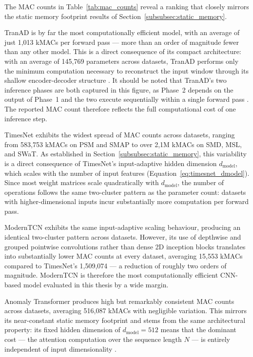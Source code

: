 \documentclass[twoside,11pt,openright]{report}
\begin{document}
The MAC counts in Table~\ref{tab:mac_counts} reveal a ranking that closely mirrors
the static memory footprint results of Section~\ref{subsubsec:static_memory}.

TranAD \citep{tranad2022} is by far the most computationally efficient model,
with an average of just 1{,}013 kMACs per forward pass --- more than an order
of magnitude fewer than any other model. This is a direct consequence of its compact
architecture: with an average of 145{,}769 parameters across datasets, TranAD performs
only the minimum computation necessary to reconstruct the input window through its
shallow encoder-decoder structure \citep{tranad2022}. It should be noted that
TranAD's two inference phases are both captured in this figure, as Phase~2 depends
on the output of Phase~1 and the two execute sequentially within a single forward
pass \citep{tranad2022}. The reported MAC count therefore reflects the full
computational cost of one inference step.

TimesNet \citep{timesnet2023} exhibits the widest spread of MAC counts across
datasets, ranging from 583{,}753 kMACs on PSM and SMAP to over 2{,}1M kMACs on SMD, MSL,
and SWaT. As established in Section~\ref{subsubsec:static_memory}, this variability
is a direct consequence of TimesNet's input-adaptive hidden dimension $d_\text{model}$,
which scales with the number of input features (Equation~\ref{eq:timesnet_dmodel}).
Since most weight matrices scale quadratically with $d_\text{model}$, the number of
operations follows the same two-cluster pattern as the parameter count: datasets with
higher-dimensional inputs incur substantially more computation per forward pass.

ModernTCN \citep{moderntcn2024} exhibits the same input-adaptive scaling behaviour,
producing an identical two-cluster pattern across datasets. However, its use of
depthwise and grouped pointwise convolutions rather than dense 2D inception blocks
translates into substantially lower MAC counts at every dataset, averaging
15{,}553 kMACs compared to TimesNet's 1{,}509{,}074 --- a reduction of
roughly two orders of magnitude. ModernTCN is therefore the most computationally
efficient CNN-based model evaluated in this thesis by a wide margin.

Anomaly Transformer \citep{anomalytransformer2022} produces high but remarkably
consistent MAC counts across datasets, averaging 516{,}087 kMACs with negligible
variation. This mirrors its near-constant static memory footprint and stems from the
same architectural property: its fixed hidden dimension of $d_\text{model} = 512$
means that the dominant cost --- the attention computation over
the sequence length $N$ --- is entirely independent of input dimensionality
\citep{anomalytransformer2022}.
\end{document}
